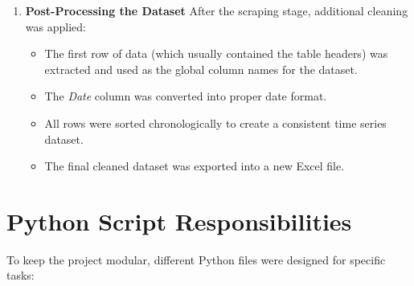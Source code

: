 \documentclass[12pt]{article}
\begin{document}
\begin{enumerate}[label=\textbf{Step \arabic*:}, leftmargin=*]
\item \textbf{Post-Processing the Dataset}  
After the scraping stage, additional cleaning was applied:
\begin{itemize}
    \item The first row of data (which usually contained the table headers) was extracted 
    and used as the global column names for the dataset.
    \item The \emph{Date} column was converted into proper date format.
    \item All rows were sorted chronologically to create a consistent time series dataset.
    \item The final cleaned dataset was exported into a new Excel file.
\end{itemize}

\end{enumerate}

\section*{Python Script Responsibilities}
To keep the project modular, different Python files were designed for specific tasks:
\end{document}
